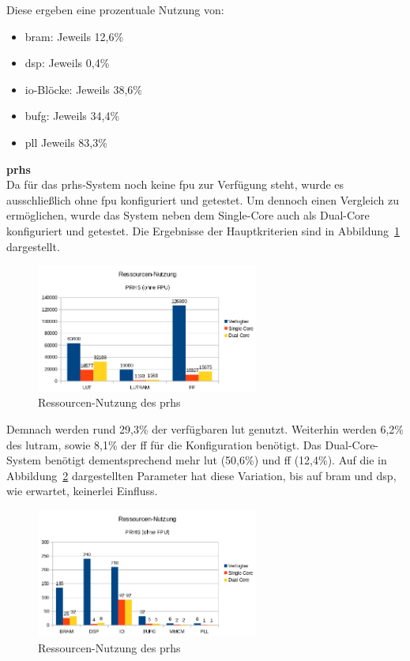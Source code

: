 Diese ergeben eine prozentuale Nutzung von:\\
\begin{itemize}
  \item \ac{bram}: Jeweils 12,6\%
  \item \ac{dsp}: Jeweils 0,4\%
  \item \ac{io}-Blöcke: Jeweils 38,6\%
  \item \ac{bufg}: Jeweils 34,4\%
  \item \ac{pll} Jeweils 83,3\%
\end{itemize}


\textbf{\acl{prhs}}\\

Da für das \ac{prhs}-System noch keine \ac{fpu} zur Verfügung steht, wurde es ausschließlich ohne \ac{fpu} konfiguriert und getestet.
Um dennoch einen Vergleich zu ermöglichen, wurde das System neben dem Single-Core auch als Dual-Core konfiguriert und getestet.
Die Ergebnisse der Hauptkriterien sind in Abbildung~\ref{fig:ressourcenprhs1} dargestellt.\\

\begin{figure}[H]
\centering
\includegraphics[width=0.65\textwidth]{Hauptteil/ressourcenprhs1.png}
\caption{Ressourcen-Nutzung des \ac{prhs}}
\label{fig:ressourcenprhs1}
\end{figure}

Demnach werden rund 29,3\% der verfügbaren \ac{lut} genutzt. Weiterhin werden 6,2\% des \ac{lutram}, sowie 8,1\% der \ac{ff} für die Konfiguration benötigt.
Das Dual-Core-System benötigt dementsprechend mehr \ac{lut} (50,6\%) und \ac{ff} (12,4\%).
 Auf die in Abbildung~\ref{fig:ressourcenprhs2} dargestellten Parameter hat diese Variation, bis auf \ac{bram} und \ac{dsp}, wie erwartet, keinerlei Einfluss.\\

\begin{figure}[H]
\centering
\includegraphics[width=0.65\textwidth]{Hauptteil/ressourcenprhs2.png}
\caption{Ressourcen-Nutzung des \ac{prhs}}
\label{fig:ressourcenprhs2}
\end{figure}

